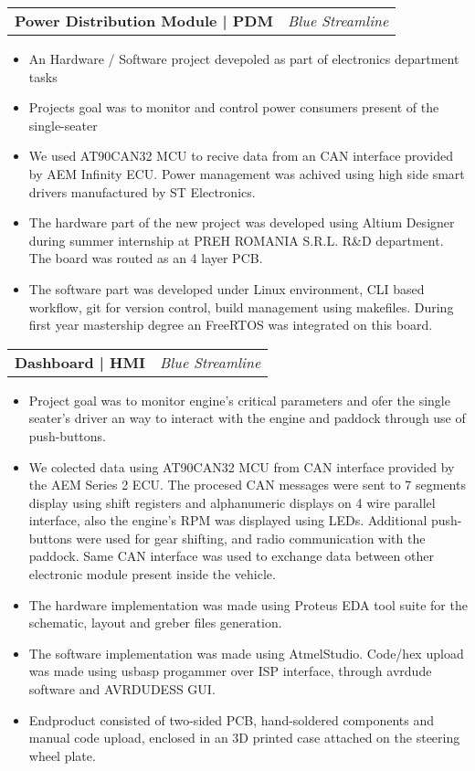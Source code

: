 \documentclass[letterpaper,11pt]{article}
\makeatletter
\newcommand{\resumeItem}[1]{
  \item\small{
    {#1 \vspace{-2pt}}
  }
}
\newcommand{\resumeProjectHeading}[2]{
    \vspace{-2pt}\item
    \begin{tabular*}{0.97\textwidth}{l@{\extracolsep{\fill}}r}
      \small#1 & #2 \\
    \end{tabular*}\vspace{-7pt}
}
\newcommand{\resumeItemListStart}{\begin{itemize}}
\newcommand{\resumeItemListEnd}{\end{itemize}\vspace{-5pt}}
\makeatother
\begin{document}
    \resumeProjectHeading
      {\textbf{Power Distribution Module | PDM}}{\textit{Blue Streamline}}
        \resumeItemListStart
          \resumeItem{An Hardware / Software project devepoled as part of electronics department tasks}
          \resumeItem{Projects goal was to monitor and control power consumers present of the single-seater}
          \resumeItem{We used AT90CAN32 MCU to recive data from an CAN interface provided by AEM Infinity ECU.
                      Power management was achived using high side smart drivers manufactured by ST Electronics.}
          \resumeItem{The hardware part of the new project was developed using Altium Designer during summer internship
                      at PREH ROMANIA S.R.L. R\&D department. The board was routed as an 4 layer PCB.}
          \resumeItem{The software part was developed under Linux environment, CLI based workflow,
                      git for version control, build management using makefiles. 
                      During first year mastership degree an FreeRTOS was integrated on this board.}
        \resumeItemListEnd
    
    \resumeProjectHeading
      {\textbf{Dashboard | HMI}}{\textit{Blue Streamline}}
        \resumeItemListStart
          \resumeItem{Project goal was to monitor engine's critical parameters and ofer the single seater's driver
                      an way to interact with the engine and paddock through use of push-buttons.}
          \resumeItem{We colected data using AT90CAN32 MCU from CAN interface provided by the
                      AEM Series 2 ECU. The procesed CAN messages were sent to 7 segments display using shift registers 
                      and alphanumeric displays on 4 wire parallel interface, also the engine's RPM was displayed using LEDs.
                      Additional push-buttons were used for gear shifting, and radio communication with the paddock.
                      Same CAN interface was used to exchange data between other electronic module present inside the vehicle.}
          \resumeItem{The hardware implementation was made using Proteus EDA tool suite for the schematic, layout
                      and greber files generation.}
          \resumeItem{The software implementation was made using AtmelStudio.
                      Code/hex upload was made using usbasp progammer over ISP interface, through avrdude software
                      and AVRDUDESS GUI.}
          \resumeItem{Endproduct consisted of two-sided PCB, hand-soldered components and manual code upload, 
                      enclosed in an 3D printed case attached on the steering wheel plate.}
        \resumeItemListEnd
    
\end{document}
